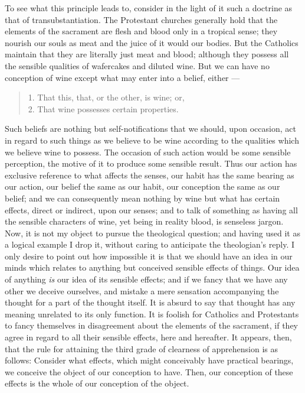 \documentclass[]{article}
\begin{document}
To see what this principle leads to, consider in the light of it such a doctrine as that of transubstantiation. The Protestant churches generally hold that the elements of the sacrament are flesh and blood only in a tropical sense; they nourish our souls as meat and the juice of it would our bodies. But the Catholics maintain that they are literally just meat and blood; although they possess all the sensible qualities of wafercakes and diluted wine. But we can have no conception of wine except what may enter into a belief, either ---
\begin{quote}
1. That this, that, or the other, is wine; or,\\
2. That wine possesses certain properties.
\end{quote}

Such beliefs are nothing but self-notifications that we should, upon occasion, act in regard to such things as we believe to be wine according to the qualities which we believe wine to possess. The occasion  of such action would be some sensible perception, the motive of it to produce some sensible result. Thus our action has exclusive reference to what affects the senses, our habit has the same bearing as our action, our belief the same as our habit, our conception the same as our belief; and we can consequently mean nothing by wine but what has certain effects, direct or indirect, upon our senses; and to talk of something as having all the sensible characters of wine, yet being in reality blood, is senseless jargon. Now, it is not my object to pursue the theological question; and having used it as a logical example I drop it, without caring to anticipate the theologian's reply. I only desire to point out how impossible it is that we should have an idea in our minds which relates to anything but conceived sensible effects of things. Our idea of anything \emph{is} our idea of its sensible effects; and if we fancy that we have any other we deceive ourselves, and mistake a mere sensation accompanying the thought for a part of the thought itself. It is absurd to say that thought has any meaning unrelated to its only function. It is foolish for Catholics and Protestants to fancy themselves in disagreement about the elements of the sacrament, if they agree in regard to all their sensible effects, here and hereafter.
It appears, then, that the rule for attaining the third grade of clearness of apprehension is as follows: Consider what effects, which might conceivably have practical bearings, we conceive the object of our conception to have. Then, our conception of these effects is the whole of our conception of the object.
\end{document}
